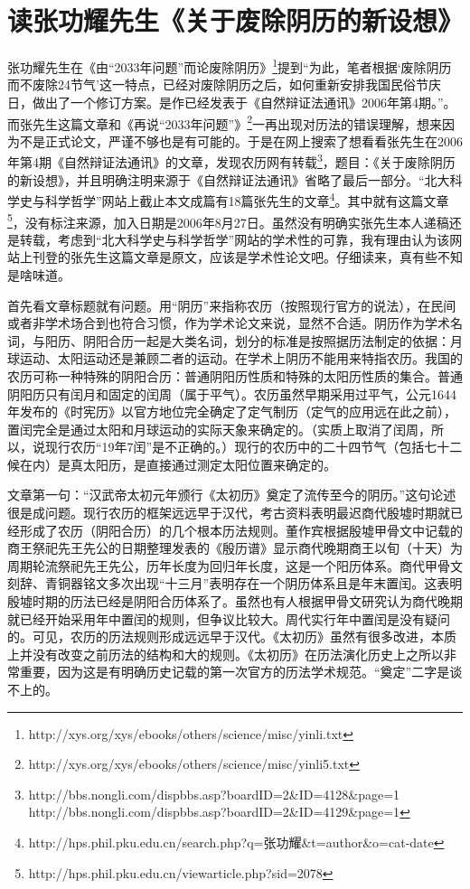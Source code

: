 \section{读张功耀先生《关于废除阴历的新设想》}
张功耀先生在《由“2033年问题”而论废除阴历》\footnote{http://xys.org/xys/ebooks/others/science/misc/yinli.txt}提到“为此，笔者根据‘废除阴历而不废除24节气’这一特点，已经对废除阴历之后，如何重新安排我国民俗节庆日，做出了一个修订方案。是作已经发表于《自然辩证法通讯》2006年第4期。”。而张先生这篇文章和《再说“2033年问题”》\footnote{http://xys.org/xys/ebooks/others/science/misc/yinli5.txt}一再出现对历法的错误理解，想来因为不是正式论文，严谨不够也是有可能的。于是在网上搜索了想看看张先生在2006年第4期《自然辩证法通讯》的文章，发现农历网有转载\footnote{http://bbs.nongli.com/dispbbs.asp?boardID=2\&ID=4128\&page=1\\http://bbs.nongli.com/dispbbs.asp?boardID=2\&ID=4129\&page=1}，题目：《关于废除阴历的新设想》，并且明确注明来源于《自然辩证法通讯》省略了最后一部分。“北大科学史与科学哲学”网站上截止本文成篇有18篇张先生的文章\footnote{http://hps.phil.pku.edu.cn/search.php?q=张功耀\&t=author\&o=cat-date}。其中就有这篇文章\footnote{http://hps.phil.pku.edu.cn/viewarticle.php?sid=2078}，没有标注来源，加入日期是2006年8月27日。虽然没有明确实张先生本人递稿还是转载，考虑到“北大科学史与科学哲学”网站的学术性的可靠，我有理由认为该网站上刊登的张先生这篇文章是原文，应该是学术性论文吧。仔细读来，真有些不知是啥味道。

首先看文章标题就有问题。用“阴历”来指称农历（按照现行官方的说法），在民间或者非学术场合到也符合习惯，作为学术论文来说，显然不合适。阴历作为学术名词，与阳历、阴阳合历一起是大类名词，划分的标准是按照据历法制定的依据：月球运动、太阳运动还是兼顾二者的运动。在学术上阴历不能用来特指农历。我国的农历可称一种特殊的阴阳合历：普通阴阳历性质和特殊的太阳历性质的集合。普通阴阳历只有闰月和固定的闰周（属于平气）。农历虽然早期采用过平气，公元1644年发布的《时宪历》以官方地位完全确定了定气制历（定气的应用远在此之前），置闰完全是通过太阳和月球运动的实际天象来确定的。（实质上取消了闰周，所以，说现行农历“19年7闰”是不正确的。）现行的农历中的二十四节气（包括七十二候在内）是真太阳历，是直接通过测定太阳位置来确定的。

文章第一句：“汉武帝太初元年颁行《太初历》奠定了流传至今的阴历。”这句论述很是成问题。现行农历的框架远远早于汉代，考古资料表明最迟商代殷墟时期就已经形成了农历（阴阳合历）的几个根本历法规则。董作宾根据殷墟甲骨文中记载的商王祭祀先王先公的日期整理发表的《殷历谱》显示商代晚期商王以旬（十天）为周期轮流祭祀先王先公，历年长度为回归年长度，这是一个阳历体系。商代甲骨文刻辞、青铜器铭文多次出现“十三月”表明存在一个阴历体系且是年末置闰。这表明殷墟时期的历法已经是阴阳合历体系了。虽然也有人根据甲骨文研究认为商代晚期就已经开始采用年中置闰的规则，但争议比较大。周代实行年中置闰是没有疑问的。可见，农历的历法规则形成远远早于汉代。《太初历》虽然有很多改进，本质上并没有改变之前历法的结构和大的规则。《太初历》在历法演化历史上之所以非常重要，因为这是有明确历史记载的第一次官方的历法学术规范。“奠定”二字是谈不上的。

